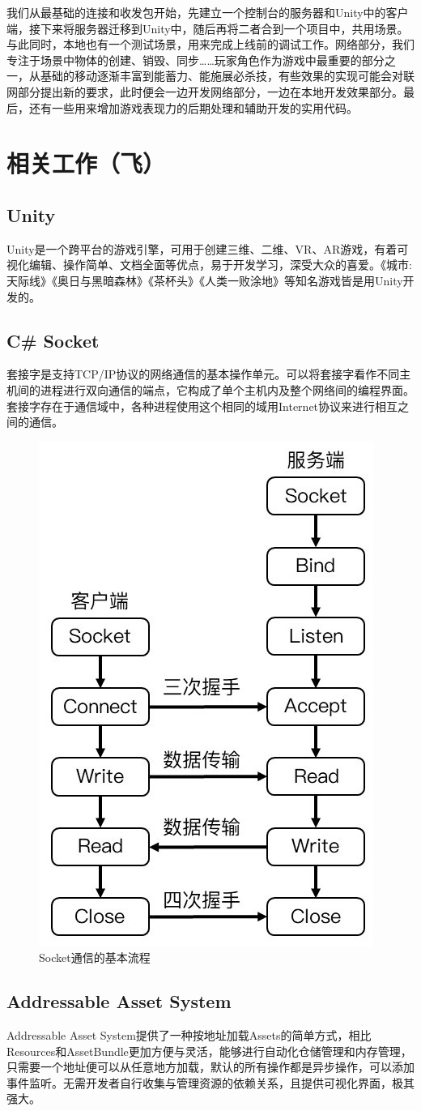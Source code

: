 \documentclass[conference]{IEEEtran}
\begin{document}
我们从最基础的连接和收发包开始，先建立一个控制台的服务器和Unity中的客户端，接下来将服务器迁移到Unity中，随后再将二者合到一个项目中，共用场景。与此同时，本地也有一个测试场景，用来完成上线前的调试工作。网络部分，我们专注于场景中物体的创建、销毁、同步……玩家角色作为游戏中最重要的部分之一，从基础的移动逐渐丰富到能蓄力、能施展必杀技，有些效果的实现可能会对联网部分提出新的要求，此时便会一边开发网络部分，一边在本地开发效果部分。最后，还有一些用来增加游戏表现力的后期处理和辅助开发的实用代码。


\section{相关工作（飞）}
\subsection{Unity}
Unity是一个跨平台的游戏引擎，可用于创建三维、二维、VR、AR游戏，有着可视化编辑、操作简单、文档全面等优点，易于开发学习，深受大众的喜爱。《城市:天际线》《奥日与黑暗森林》《茶杯头》《人类一败涂地》等知名游戏皆是用Unity开发的。

\subsection{C\# Socket}
套接字是支持TCP/IP协议的网络通信的基本操作单元。可以将套接字看作不同主机间的进程进行双向通信的端点，它构成了单个主机内及整个网络间的编程界面。套接字存在于通信域中，各种进程使用这个相同的域用Internet协议来进行相互之间的通信。\cite{Unity3D网络游戏实战}

\begin{figure}[htbp]
    \centerline{\includegraphics[width=.22\textwidth]{images/Socket通信的基本流程.jpg}}
    \caption{Socket通信的基本流程}
    \label{fig:socket}
\end{figure}


\subsection{Addressable Asset System}
Addressable Asset System提供了一种按地址加载Assets的简单方式，相比Resources和AssetBundle更加方便与灵活，能够进行自动化仓储管理和内存管理，只需要一个地址便可以从任意地方加载，默认的所有操作都是异步操作，可以添加事件监听。无需开发者自行收集与管理资源的依赖关系，且提供可视化界面，极其强大。
\end{document}

